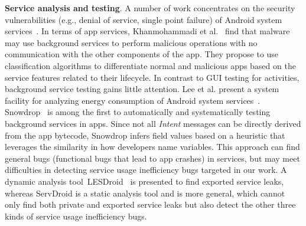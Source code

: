 \documentclass[sigconf,review, anonymous]{acmart}
\begin{document}
\textbf{Service analysis and testing}. A number of work concentrates on the
security vulnerabilities (e.g., denial of service, single point failure) of
Android system services~\cite{ReavesBGABCDHKS16,HuangZ0015,WangZL16,FengS16,AbualolaAKOM16,LuoZCCLLGYXL17}.
In terms of app services, Khanmohammadi et al.~\cite{KhRH15} find that malware
may use background services to perform malicious operations with no communication with
the other components of the app.
They propose to use classification algorithms to differentiate normal and
malicious apps based on the service features related to their lifecycle. In
contrast to GUI testing for activities, background service testing gains little
attention.  Lee et al. present a system facility for analyzing energy consumption of Android system services~\cite{LeeJCC15}. \textsf{Snowdrop}~\cite{ZhangLLC17} is among the first to
automatically and systematically testing background services in apps. Since not
all \textit{Intent} messages can be directly derived from the app bytecode,
\textsf{Snowdrop} infers field values based on a heuristic that leverages the
similarity in how developers name variables. This approach can find general bugs
(functional bugs that lead to app crashes) in services, but may meet
difficulties in detecting service usage inefficiency bugs targeted in our work.
A dynamic analysis tool~\textsf{LESDroid}~\cite{ma2018} is presented to find
exported service leaks, whereas \textsf{ServDroid} is a static analysis tool and
is more general, which cannot only find both private and exported service leaks
but also detect the other three kinds of service usage inefficiency bugs.
\end{document}
